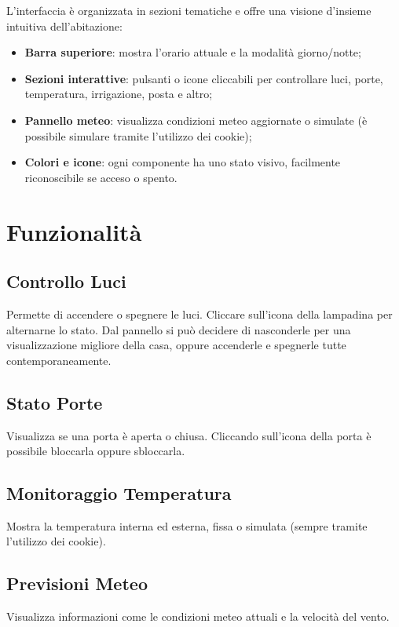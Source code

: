 \documentclass[a4paper,12pt]{article}
\begin{document}
L’interfaccia è organizzata in sezioni tematiche e offre una visione d’insieme intuitiva dell’abitazione:

\begin{itemize}
  \item \textbf{Barra superiore}: mostra l’orario attuale e la modalità giorno/notte;
  \item \textbf{Sezioni interattive}: pulsanti o icone cliccabili per controllare luci, porte, temperatura, irrigazione, posta e altro;
  \item \textbf{Pannello meteo}: visualizza condizioni meteo aggiornate o simulate (è possibile simulare tramite l'utilizzo dei cookie);
  \item \textbf{Colori e icone}: ogni componente ha uno stato visivo, facilmente riconoscibile se acceso o spento.
\end{itemize}

\section{Funzionalità}

\subsection*{Controllo Luci}
Permette di accendere o spegnere le luci. Cliccare sull’icona della lampadina per alternarne lo stato. Dal pannello si può decidere di nasconderle per una visualizzazione migliore della casa, oppure accenderle e spegnerle tutte contemporaneamente.

\subsection*{Stato Porte}
Visualizza se una porta è aperta o chiusa. Cliccando sull’icona della porta è possibile bloccarla oppure sbloccarla.

\subsection*{Monitoraggio Temperatura}
Mostra la temperatura interna ed esterna, fissa o simulata (sempre tramite l'utilizzo dei cookie).

\subsection*{Previsioni Meteo}
Visualizza informazioni come le condizioni meteo attuali e la velocità del vento.
\end{document}
